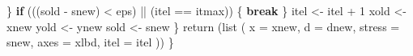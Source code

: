 \documentclass[
  12pt,
]{book}
\newenvironment{Shaded}{\begin{snugshade}}{\end{snugshade}}
\newcommand{\AttributeTok}[1]{\textcolor[rgb]{0.77,0.63,0.00}{#1}}
\newcommand{\ControlFlowTok}[1]{\textcolor[rgb]{0.13,0.29,0.53}{\textbf{#1}}}
\newcommand{\DecValTok}[1]{\textcolor[rgb]{0.00,0.00,0.81}{#1}}
\newcommand{\FunctionTok}[1]{\textcolor[rgb]{0.00,0.00,0.00}{#1}}
\newcommand{\NormalTok}[1]{#1}
\newcommand{\OtherTok}[1]{\textcolor[rgb]{0.56,0.35,0.01}{#1}}
\newcommand{\SpecialCharTok}[1]{\textcolor[rgb]{0.00,0.00,0.00}{#1}}
\theoremstyle{definition}
\theoremstyle{definition}
\theoremstyle{definition}
\theoremstyle{definition}
\theoremstyle{remark}
\begin{document}
\begin{Shaded}
\begin{Highlighting}[]
\NormalTok{      \}}
      \ControlFlowTok{if}\NormalTok{ (((sold }\SpecialCharTok{{-}}\NormalTok{ snew) }\SpecialCharTok{\textless{}}\NormalTok{ eps) }\SpecialCharTok{||}\NormalTok{ (itel }\SpecialCharTok{==}\NormalTok{ itmax)) \{}
        \ControlFlowTok{break}
\NormalTok{      \}}
\NormalTok{      itel }\OtherTok{\textless{}{-}}\NormalTok{ itel }\SpecialCharTok{+} \DecValTok{1}
\NormalTok{      xold }\OtherTok{\textless{}{-}}\NormalTok{ xnew}
\NormalTok{      yold }\OtherTok{\textless{}{-}}\NormalTok{ ynew}
\NormalTok{      sold }\OtherTok{\textless{}{-}}\NormalTok{ snew}
\NormalTok{    \}}
    \FunctionTok{return}\NormalTok{ (}\FunctionTok{list}\NormalTok{ (}
      \AttributeTok{x =}\NormalTok{ xnew,}
      \AttributeTok{d =}\NormalTok{ dnew,}
      \AttributeTok{stress =}\NormalTok{ snew,}
      \AttributeTok{axes =}\NormalTok{ xlbd,}
      \AttributeTok{itel =}\NormalTok{ itel}
\NormalTok{    ))}
\NormalTok{  \}}


\end{Highlighting}
\end{Shaded}
\end{document}
